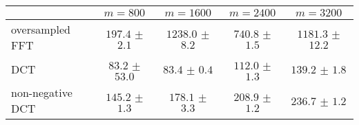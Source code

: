 \centering
\renewcommand{\arraystretch}{1.2}
\begin{tabular}{@{}lcccc@{}}
\toprule
 & $m=800$ & $m=1600$ & $m=2400$ & $m=3200$\\
\midrule
oversampled FFT & $197.4$ $\pm$ $2.1$ & $1238.0$ $\pm$ $8.2$ & $740.8$ $\pm$ $1.5$ & $1181.3$ $\pm$ $12.2$ \\
DCT & $83.2$ $\pm$ $53.0$ & $83.4$ $\pm$ $0.4$ & $112.0$ $\pm$ $1.3$ & $139.2$ $\pm$ $1.8$ \\
non-negative DCT & $145.2$ $\pm$ $1.3$ & $178.1$ $\pm$ $3.3$ & $208.9$ $\pm$ $1.2$ & $236.7$ $\pm$ $1.2$ \\
\bottomrule
\end{tabular}
